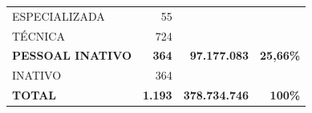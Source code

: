 \documentclass{article}
\begin{document}
\begin{longtable}[c]{m{7cm}|m{2.5cm}|m{2.5cm}|m{2.5cm}}
\multicolumn{1}{L{7cm}|}{ \hspace{3em} ESPECIALIZADA} & \multicolumn{1}{r|}{ 55} &  & \\
\multicolumn{1}{L{7cm}|}{ \hspace{3em} TÉCNICA} & \multicolumn{1}{r|}{ 724} &  & \\
\multicolumn{1}{L{7cm}|}{ \textbf{PESSOAL INATIVO}} & \multicolumn{1}{r|}{ \textbf{  364}} & \multicolumn{1}{r|}{ \textbf{ 97.177.083}} & \multicolumn{1}{r}{ \textbf{25,66\%}} \\
\multicolumn{1}{L{7cm}|}{ \hspace{3em} INATIVO} & \multicolumn{1}{r|}{ 364} &  & \\
\hline \hline 
\multicolumn{1}{L{7cm}|}{ \textbf{TOTAL}} & \multicolumn{1}{r|}{ \textbf{1.193}} & \multicolumn{1}{r|}{ \textbf{378.734.746}} & \multicolumn{1}{r}{ \textbf{100\%}} \\
\end{longtable}
\newpage
\small
\end{document}

